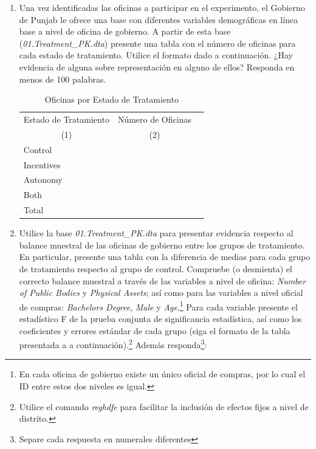 \documentclass[a4paper, answers, addpoints, 11pt]{exam}
\begin{document}
\begin{enumerate}
    \item Una vez identificadas las oficinas a participar en el experimento, el Gobierno de Punjab le ofrece una base con diferentes variables demográficas en línea base a nivel de oficina de gobierno. A partir de esta base (\textit{01.Treatment\_PK.dta}) presente una tabla con el número de oficinas para cada estado de tratamiento. Utilice el formato dado a continuación. ¿Hay evidencia de alguna sobre representación en alguno de ellos? Responda en menos de 100 palabras.
    \begin{table}[H]
		\centering
			\caption{Oficinas por Estado de Tratamiento}
			\label{tab1:equivalence}
			\begin{tabular}{lcc}
				\toprule
				\multicolumn{1}{c}{Estado de Tratamiento} & \multicolumn{1}{c}{Número de Oficinas}  \\
				\multicolumn{1}{c}{(1)} & 	\multicolumn{1}{c}{(2)} \\ \toprule
				  \addlinespace 
				Control & \\
                Incentives & \\
                Autonomy & \\
                Both & \\ \midrule
                Total & \\ \bottomrule
			\end{tabular}	
	\end{table}
    \item Utilice la base \textit{01.Treatment\_PK.dta} para presentar evidencia respecto al balance muestral de las oficinas de gobierno entre los grupos de tratamiento. En particular, presente una tabla con la diferencia de medias para cada grupo de tratamiento respecto al grupo de control. Compruebe (o desmienta) el correcto balance muestral a través de las variables a nivel de oficina: \textit{Number of Public Bodies} y \textit{Physical Assets}; así como para las variables a nivel oficial de compras: \textit{Bachelors Degree}, \textit{Male} y \textit{Age}.\footnote{\footnotesize{En cada oficina de gobierno existe un único oficial de compras, por lo cual el ID entre estos dos niveles es igual.}} Para cada variable presente el estadístico F de la prueba conjunta de significancia estadística, así como los coeficientes y errores estándar de cada grupo (siga el formato de la tabla presentada a a continuación).\footnote{\footnotesize{Utilice el comando \textit{reghdfe} para facilitar la inclusión de efectos fijos a nivel de distrito.}} Además responda\footnote{\footnotesize{Separe cada respuesta en numerales diferentes}}:


\end{enumerate}
\end{document}
